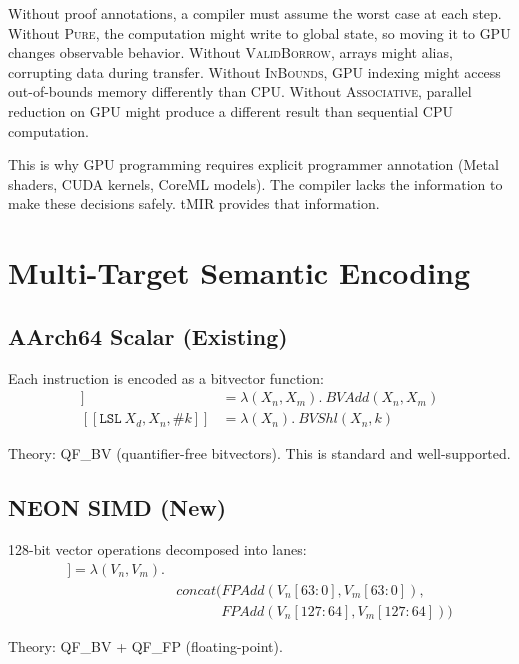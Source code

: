 \documentclass[11pt,twocolumn]{article}
\begin{document}
Without proof annotations, a compiler must assume the worst case at each step. Without \textsc{Pure}, the computation might write to global state, so moving it to GPU changes observable behavior. Without \textsc{ValidBorrow}, arrays might alias, corrupting data during transfer. Without \textsc{InBounds}, GPU indexing might access out-of-bounds memory differently than CPU. Without \textsc{Associative}, parallel reduction on GPU might produce a different result than sequential CPU computation.

This is why GPU programming requires explicit programmer annotation (Metal shaders, CUDA kernels, CoreML models). The compiler lacks the information to make these decisions safely. tMIR provides that information.

\section{Multi-Target Semantic Encoding}
\label{sec:encoding}

\subsection{AArch64 Scalar (Existing)}

Each instruction is encoded as a bitvector function:
\begin{align*}
[\![ \mathtt{ADD}\ X_d, X_n, X_m ]\!] &= \lambda(X_n, X_m).\ \mathit{BVAdd}(X_n, X_m) \\
[\![ \mathtt{LSL}\ X_d, X_n, \#k ]\!] &= \lambda(X_n).\ \mathit{BVShl}(X_n, k)
\end{align*}

Theory: QF\_BV (quantifier-free bitvectors). This is standard and well-supported.

\subsection{NEON SIMD (New)}

128-bit vector operations decomposed into lanes:
\begin{align*}
[\![ \mathtt{FADD.2D}\ &V_d, V_n, V_m ]\!] = \lambda(V_n, V_m).\\
&\mathit{concat}(\mathit{FPAdd}(V_n[63{:}0], V_m[63{:}0]),\\
&\qquad\quad\ \mathit{FPAdd}(V_n[127{:}64], V_m[127{:}64]))
\end{align*}

Theory: QF\_BV + QF\_FP (floating-point).
\end{document}
